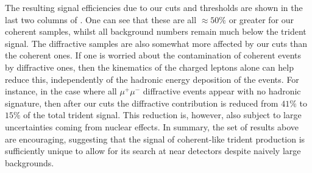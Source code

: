The resulting signal efficiencies due to our cuts and thresholds are shown in the last two columns of . One can see that these are all $ \approx 50\%$ or greater for our coherent samples, whilst all background numbers remain much below the trident signal. The diffractive samples are also somewhat more affected by our cuts than the coherent ones. If one is worried about the contamination of coherent events by diffractive ones, then the kinematics of the charged leptons alone can help reduce this, independently of the hadronic energy deposition of the events. For instance, in the case where all $\mu^+\mu^-$ diffractive events appear with no hadronic signature, then after our cuts the diffractive contribution is reduced from $41\%$ to $15\%$ of the total trident signal. This reduction is, however, also subject to large uncertainties coming from nuclear effects. In summary, the set of results above are encouraging, suggesting that the signal of coherent-like trident production is sufficiently unique to allow for its search at near detectors despite naively large backgrounds. 

